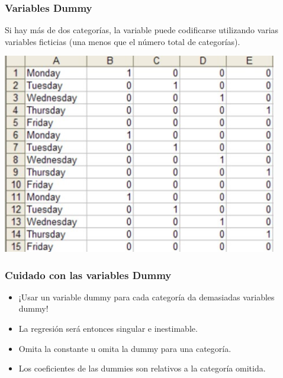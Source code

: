 \documentclass[10pt]{beamer}
\begin{document}
\begin{frame}[fragile]
\frametitle{Variables Dummy}


\begin{minipage}[c]{.35\textwidth}
Si hay más de dos categorías, la variable puede codificarse
utilizando varias variables ficticias (una menos que el número total de categorías).
\end{minipage}
\begin{minipage}[c]{.60\textwidth}
\begin{center}
\includegraphics[width=0.9\textwidth]{dummy3.JPG}
\end{center}
\end{minipage}


\end{frame}






\begin{frame}[fragile]
\frametitle{Cuidado con las variables Dummy}

\begin{itemize}
\item ¡Usar un variable dummy para cada categoría da demasiadas variables dummy!

\item La regresión será entonces singular e inestimable.

\item Omita la constante u omita la dummy para una categoría.

\item Los coeficientes de las dummies son relativos a la categoría omitida.

\end{itemize}



\end{frame}
\end{document}
